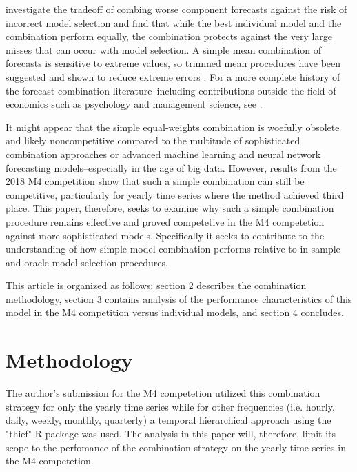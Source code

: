 \documentclass[11pt,3p,review,authoryear]{elsarticle}
\begin{document}
\cite{HIBON2005} investigate the tradeoff of combing worse component forecasts against the risk of incorrect model selection and find that while the best individual model and the combination perform equally, the combination protects against the very large misses that can occur with model selection. A simple mean combination of forecasts is sensitive to extreme values, so trimmed mean procedures have been suggested and shown to reduce extreme errors \citep{JOSE2008}. For a more complete history of the forecast combination literature--including contributions outside the field of economics such as psychology and management science, see \cite{CLEMEN1988}.

It might appear that the simple equal-weights combination is woefully obsolete and likely noncompetitive compared to the multitude of sophisticated combination approaches or advanced machine learning and neural network forecasting models--especially in the age of big data. However, results from the 2018 M4 competition \citep{M4} show that such a simple combination can still be competitive, particularly for yearly time series where the method achieved third place. This paper, therefore, seeks to examine why such a simple combination procedure remains effective and proved competetive in the M4 competetion against more sophisticated models. Specifically it seeks to contribute to the understanding of how simple model combination performs relative to in-sample and oracle model selection procedures.


This article is organized as follows: section 2 describes the combination methodology, section 3 contains analysis of the performance characteristics of this model in the M4 competition versus individual models, and section 4 concludes.


\section{Methodology}
The author's submission for the M4 competetion utilized this combination strategy for only the yearly time series while for other frequencies (i.e. hourly, daily, weekly, monthly, quarterly) a temporal hierarchical approach using the "thief" R package \citep{ATHANASOPOULOS201760} was used. The analysis in this paper will, therefore, limit its scope to the perfomance of the combination strategy on the yearly time series in the M4 competetion.
\end{document}

